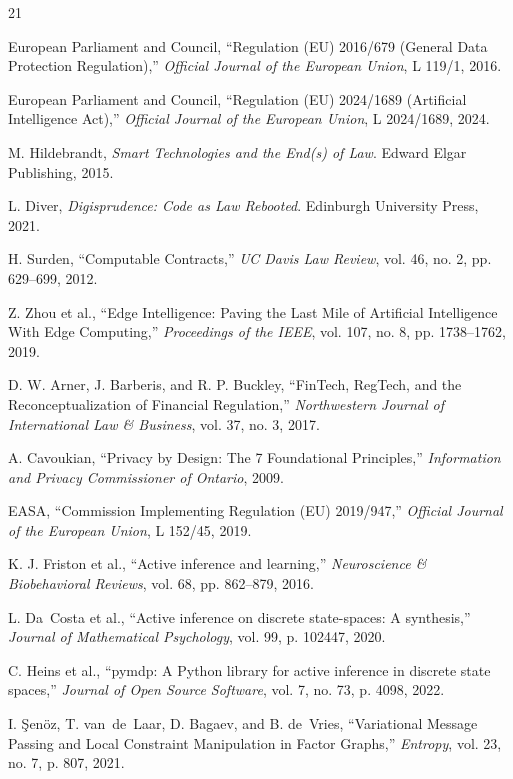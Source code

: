 \documentclass[10pt,twocolumn]{article}
\begin{document}
\begin{thebibliography}{21}

European Parliament and Council, ``Regulation (EU) 2016/679 (General Data Protection Regulation),'' \textit{Official Journal of the European Union}, L 119/1, 2016.

European Parliament and Council, ``Regulation (EU) 2024/1689 (Artificial Intelligence Act),'' \textit{Official Journal of the European Union}, L 2024/1689, 2024.

M. Hildebrandt, \textit{Smart Technologies and the End(s) of Law}. Edward Elgar Publishing, 2015.

L. Diver, \textit{Digisprudence: Code as Law Rebooted}. Edinburgh University Press, 2021.

H. Surden, ``Computable Contracts,'' \textit{UC Davis Law Review}, vol. 46, no. 2, pp. 629--699, 2012.

Z. Zhou et al., ``Edge Intelligence: Paving the Last Mile of Artificial Intelligence With Edge Computing,'' \textit{Proceedings of the IEEE}, vol. 107, no. 8, pp. 1738--1762, 2019.

D. W. Arner, J. Barberis, and R. P. Buckley, ``FinTech, RegTech, and the Reconceptualization of Financial Regulation,'' \textit{Northwestern Journal of International Law \& Business}, vol. 37, no. 3, 2017.

A. Cavoukian, ``Privacy by Design: The 7 Foundational Principles,'' \textit{Information and Privacy Commissioner of Ontario}, 2009.

EASA, ``Commission Implementing Regulation (EU) 2019/947,'' \textit{Official Journal of the European Union}, L 152/45, 2019.

K. J. Friston et al., ``Active inference and learning,'' \textit{Neuroscience \& Biobehavioral Reviews}, vol. 68, pp. 862--879, 2016.

L. Da~Costa et al., ``Active inference on discrete state-spaces: A synthesis,'' \textit{Journal of Mathematical Psychology}, vol. 99, p. 102447, 2020.

C. Heins et al., ``pymdp: A Python library for active inference in discrete state spaces,'' \textit{Journal of Open Source Software}, vol. 7, no. 73, p. 4098, 2022.

I. \c{S}en\"{o}z, T. van~de~Laar, D. Bagaev, and B. de~Vries, ``Variational Message Passing and Local Constraint Manipulation in Factor Graphs,'' \textit{Entropy}, vol. 23, no. 7, p. 807, 2021.


\end{thebibliography}
\end{document}
